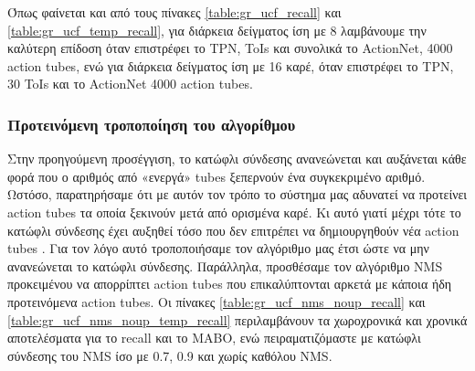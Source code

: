 Όπως φαίνεται και από τους πίνακες \ref{table:gr_ucf_recall} και \ref{table:gr_ucf_temp_recall}, για διάρκεια δείγματος ίση με 8 λαμβάνουμε
την καλύτερη επίδοση όταν επιστρέφει το \en TPN,  \en ToIs \gr και συνολικά το \en ActionNet,  4000  action tubes\gr, ενώ
για διάρκεια δείγματος ίση με 16 καρέ, όταν επιστρέφει το \en TPN, 30 ToIs \gr και το \en ActionNet  4000 action tubes.\gr \par

\subsubsection{Προτεινόμενη τροποποίηση του αλγορίθμου}

Στην προηγούμενη προσέγγιση, το κατώφλι σύνδεσης ανανεώνεται και αυξάνεται κάθε φορά που ο αριθμός από «ενεργά» \en tubes \gr ξεπερνούν ένα
συγκεκριμένο αριθμό. Ωστόσο, παρατηρήσαμε ότι με αυτόν τον τρόπο το σύστημα μας αδυνατεί να προτείνει \en action tubes \gr τα οποία ξεκινούν
μετά από ορισμένα καρέ. Κι αυτό γιατί μέχρι τότε το κατώφλι σύνδεσης έχει αυξηθεί τόσο που δεν επιτρέπει να δημιουργηθούν νέα \en action tubes \gr.
Για τον λόγο αυτό τροποποιήσαμε τον αλγόριθμο μας έτσι ώστε να μην ανανεώνεται το κατώφλι σύνδεσης. Παράλληλα, προσθέσαμε τον αλγόριθμο
\en NMS \gr προκειμένου να απορρίπτει \en action tubes \gr που επικαλύπτονται αρκετά με κάποια ήδη προτεινόμενα \en action tubes\gr.
Οι πίνακες \ref{table:gr_ucf_nms_noup_recall} και  \ref{table:gr_ucf_nms_noup_temp_recall} περιλαμβάνουν τα χωροχρονικά και χρονικά αποτελέσματα
για το \en recall \gr και το \en MABO\gr, ενώ πειραματιζόμαστε με κατώφλι σύνδεσης του \en NMS \gr ίσο με 0.7, 0.9 και χωρίς καθόλου \en
NMS\gr.

